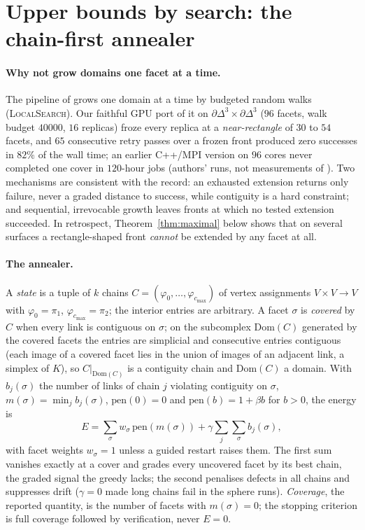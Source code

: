 \documentclass[12pt]{article}
\begin{document}
\section{Upper bounds by search: the chain-first annealer}\label{sec:annealer}

\paragraph{Why not grow domains one facet at a time.}  The pipeline of
\cite{OLGB21} grows one domain at a time by budgeted random walks
(\textsc{LocalSearch}).  Our faithful GPU port of it on
$\partial\Delta^3\times\partial\Delta^3$ ($96$ facets, walk budget $40000$,
$16$ replicas) froze every replica at a \emph{near-rectangle} of $30$ to
$54$ facets, and $65$ consecutive retry passes over a frozen front produced
zero successes in $82\%$ of the wall time; an earlier C++/MPI version on $96$
cores never completed one cover in $120$-hour jobs (authors' runs, not
measurements of \cite{OLGB21}).  Two mechanisms are consistent with the
record: an exhausted extension returns only failure, never a graded
distance to success, while contiguity is a hard constraint; and sequential,
irrevocable growth leaves fronts at which no tested extension succeeded.  In
retrospect, Theorem~\ref{thm:maximal} below shows that on several surfaces
a rectangle-shaped front \emph{cannot} be extended by any facet at all.

\paragraph{The annealer.}  A \emph{state} is a tuple of $k$ chains
$C=(\varphi_0,\dots,\varphi_{c_{\max}})$ of vertex assignments
$V\times V\to V$ with $\varphi_0=\pi_1$, $\varphi_{c_{\max}}=\pi_2$; the
interior entries are arbitrary.  A facet $\sigma$ is \emph{covered} by $C$
when every link is contiguous on $\sigma$; on the subcomplex
$\mathrm{Dom}(C)$ generated by the covered facets the entries are simplicial
and consecutive entries contiguous (each image of a covered facet lies in the
union of images of an adjacent link, a simplex of $K$), so $C|_{\mathrm{Dom}(C)}$
is a contiguity chain and $\mathrm{Dom}(C)$ a domain.  With $b_j(\sigma)$
the number of links of chain $j$ violating contiguity on $\sigma$,
$m(\sigma)=\min_j b_j(\sigma)$, $\mathrm{pen}(0)=0$ and
$\mathrm{pen}(b)=1+\beta b$ for $b>0$, the energy is
\[
E=\sum_\sigma w_\sigma\,\mathrm{pen}(m(\sigma))+\gamma\sum_j\sum_\sigma b_j(\sigma),
\]
with facet weights $w_\sigma=1$ unless a guided restart raises them.  The
first sum vanishes exactly at a cover and grades every uncovered facet by
its best chain, the graded signal the greedy lacks; the second penalises
defects in all chains and suppresses drift ($\gamma=0$ made long chains
fail in the sphere runs).  \emph{Coverage}, the reported quantity, is the
number of facets with $m(\sigma)=0$; the stopping criterion is full coverage
followed by verification, never $E=0$.
\end{document}
